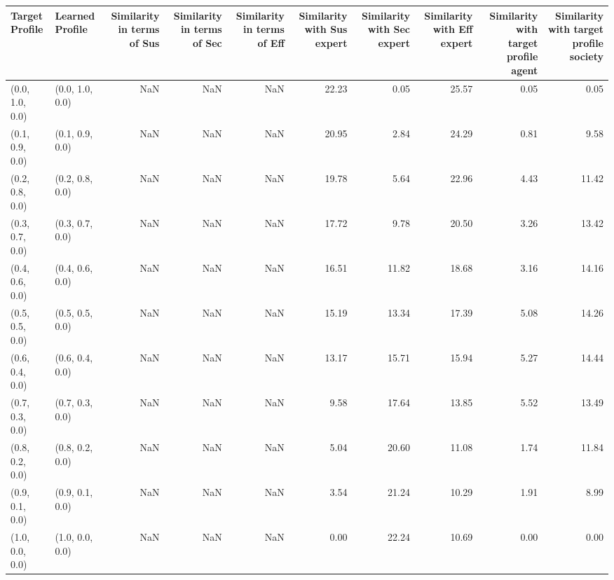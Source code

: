 \begin{tabular}{llrrrrrrrr}
\toprule
Target Profile & Learned Profile & Similarity in terms of Sus & Similarity in terms of Sec & Similarity in terms of Eff & Similarity with Sus expert & Similarity with Sec expert & Similarity with Eff expert & Similarity with target profile agent & Similarity with target profile society \\
\midrule
(0.0, 1.0, 0.0) & (0.0, 1.0, 0.0) & NaN & NaN & NaN & 22.23 & 0.05 & 25.57 & 0.05 & 0.05 \\
(0.1, 0.9, 0.0) & (0.1, 0.9, 0.0) & NaN & NaN & NaN & 20.95 & 2.84 & 24.29 & 0.81 & 9.58 \\
(0.2, 0.8, 0.0) & (0.2, 0.8, 0.0) & NaN & NaN & NaN & 19.78 & 5.64 & 22.96 & 4.43 & 11.42 \\
(0.3, 0.7, 0.0) & (0.3, 0.7, 0.0) & NaN & NaN & NaN & 17.72 & 9.78 & 20.50 & 3.26 & 13.42 \\
(0.4, 0.6, 0.0) & (0.4, 0.6, 0.0) & NaN & NaN & NaN & 16.51 & 11.82 & 18.68 & 3.16 & 14.16 \\
(0.5, 0.5, 0.0) & (0.5, 0.5, 0.0) & NaN & NaN & NaN & 15.19 & 13.34 & 17.39 & 5.08 & 14.26 \\
(0.6, 0.4, 0.0) & (0.6, 0.4, 0.0) & NaN & NaN & NaN & 13.17 & 15.71 & 15.94 & 5.27 & 14.44 \\
(0.7, 0.3, 0.0) & (0.7, 0.3, 0.0) & NaN & NaN & NaN & 9.58 & 17.64 & 13.85 & 5.52 & 13.49 \\
(0.8, 0.2, 0.0) & (0.8, 0.2, 0.0) & NaN & NaN & NaN & 5.04 & 20.60 & 11.08 & 1.74 & 11.84 \\
(0.9, 0.1, 0.0) & (0.9, 0.1, 0.0) & NaN & NaN & NaN & 3.54 & 21.24 & 10.29 & 1.91 & 8.99 \\
(1.0, 0.0, 0.0) & (1.0, 0.0, 0.0) & NaN & NaN & NaN & 0.00 & 22.24 & 10.69 & 0.00 & 0.00 \\
\bottomrule
\end{tabular}
